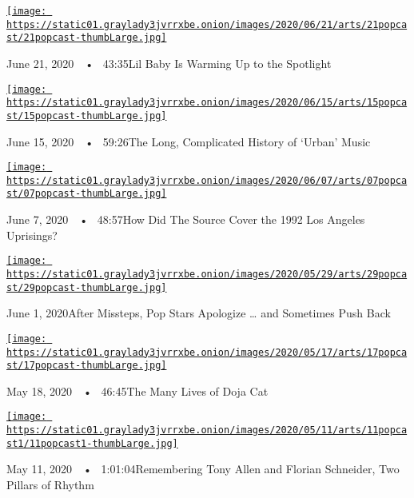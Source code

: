 \href{https://www.nytimes3xbfgragh.onion/2020/06/21/arts/music/popcast-lil-baby.html?action=click\&module=audio-series-bar\&region=header\&pgtype=Article}{\texttt{[image: https://static01.graylady3jvrrxbe.onion/images/2020/06/21/arts/21popcast/21popcast-thumbLarge.jpg]}}

June 21, 2020~~•~ 43:35Lil Baby Is Warming Up to the Spotlight

\href{https://www.nytimes3xbfgragh.onion/2020/06/15/arts/music/popcast-urban-music.html?action=click\&module=audio-series-bar\&region=header\&pgtype=Article}{\texttt{[image: https://static01.graylady3jvrrxbe.onion/images/2020/06/15/arts/15popcast/15popcast-thumbLarge.jpg]}}

June 15, 2020~~•~ 59:26The Long, Complicated History of `Urban' Music

\href{https://www.nytimes3xbfgragh.onion/2020/06/07/arts/music/popcast-the-source-rodney-king.html?action=click\&module=audio-series-bar\&region=header\&pgtype=Article}{\texttt{[image: https://static01.graylady3jvrrxbe.onion/images/2020/06/07/arts/07popcast/07popcast-thumbLarge.jpg]}}

June 7, 2020~~•~ 48:57How Did The Source Cover the 1992 Los Angeles
Uprisings?

\href{https://www.nytimes3xbfgragh.onion/2020/06/01/arts/music/popcast-lana-del-rey-doja-cat-apologies.html?action=click\&module=audio-series-bar\&region=header\&pgtype=Article}{\texttt{[image: https://static01.graylady3jvrrxbe.onion/images/2020/05/29/arts/29popcast/29popcast-thumbLarge.jpg]}}

June 1, 2020After Missteps, Pop Stars Apologize \ldots{} and Sometimes
Push Back

\href{https://www.nytimes3xbfgragh.onion/2020/05/18/arts/music/popcast-doja-cat.html?action=click\&module=audio-series-bar\&region=header\&pgtype=Article}{\texttt{[image: https://static01.graylady3jvrrxbe.onion/images/2020/05/17/arts/17popcast/17popcast-thumbLarge.jpg]}}

May 18, 2020~~•~ 46:45The Many Lives of Doja Cat

\href{https://www.nytimes3xbfgragh.onion/2020/05/11/arts/music/popcast-tony-allen-florian-schneider.html?action=click\&module=audio-series-bar\&region=header\&pgtype=Article}{\texttt{[image: https://static01.graylady3jvrrxbe.onion/images/2020/05/11/arts/11popcast1/11popcast1-thumbLarge.jpg]}}

May 11, 2020~~•~ 1:01:04Remembering Tony Allen and Florian Schneider,
Two Pillars of Rhythm

